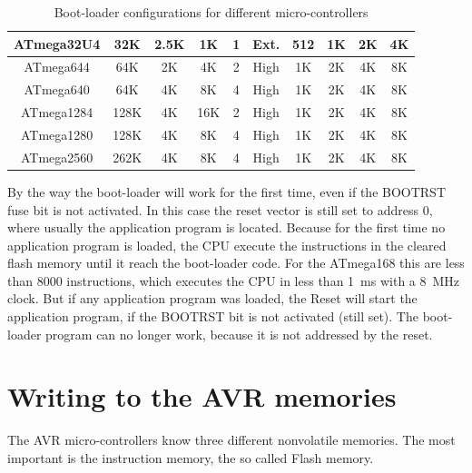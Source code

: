 \begin{table}[H]
\begin{center}
\begin{tabular}{| c | c | c | c | c | c | c | c | c | c |}
    \hline
              ATmega32U4 & 32K   & 2.5K  & 1K  &  1   & Ext.  & 512  & 1K & 2K  & 4K  \\
    \hline
              ATmega644 & 64K   & 2K   & 4K   &  2   & High  & 1K   & 2K  & 4K  & 8K  \\
    \hline
              ATmega640 & 64K   & 4K   & 8K   &  4   & High  & 1K   & 2K  & 4K  & 8K  \\
    \hline
             ATmega1284 & 128K  & 4K   & 16K  &  2   & High  & 1K   & 2K  & 4K  & 8K  \\
    \hline
             ATmega1280 & 128K  & 4K   & 8K   &  4   & High  & 1K   & 2K  & 4K  & 8K  \\
    \hline
             ATmega2560 & 262K  & 4K   & 8K   &  4   & High  & 1K   & 2K  & 4K  & 8K  \\
    \hline
    \end{tabular}
  \end{center}
  \caption{Boot-loader configurations for different micro-controllers}
  \label{tab:bootsz}
\end{table}

By the way the boot-loader will work for the first time,
even if the BOOTRST fuse bit is not activated.
In this case the reset vector is still set to address 0, where
usually the application program is located.
Because for the first time no application program is loaded,
the CPU execute the instructions in the cleared flash memory
until it reach the boot-loader code.
For the ATmega168 this are less than 8000 instructions,
which executes the CPU in less than 1~ms with a 8~MHz clock.
But if any application program was loaded, the Reset will
start the application program, if the BOOTRST bit is not activated (still set).
The boot-loader program can no longer work, because it is
not addressed by the reset.


\section{Writing to the AVR memories}

The AVR micro-controllers know three different nonvolatile memories.
The most important is the instruction memory, the so called Flash memory.

